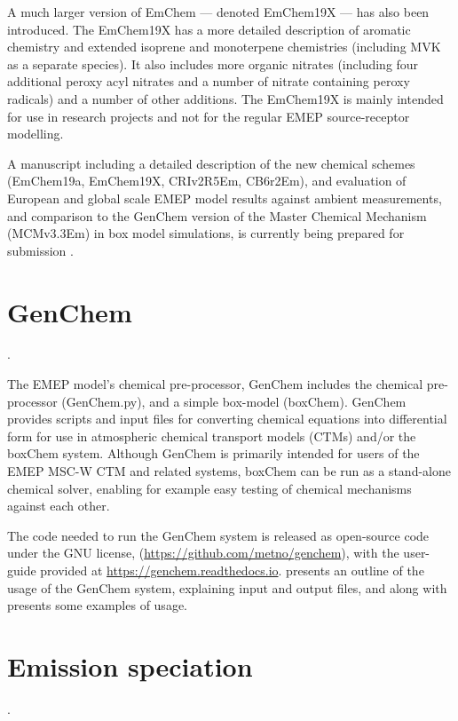 A much larger version of EmChem --- denoted EmChem19X --- has also
been introduced.  The EmChem19X has a more detailed description of
aromatic chemistry and extended isoprene and monoterpene chemistries
(including MVK as a separate species). It also includes more organic
nitrates (including four additional peroxy acyl nitrates and a number of
nitrate containing peroxy radicals) and a number of other additions. The
EmChem19X is mainly intended for use in research projects and not for
the regular EMEP source-receptor modelling.

A manuscript including a detailed description of the new chemical schemes
(EmChem19a, EmChem19X, CRIv2R5Em, CB6r2Em), and evaluation of European
and global scale EMEP model results against ambient measurements,
and comparison to the GenChem version of the Master Chemical Mechanism
(MCMv3.3Em) in box model simulations, is currently being prepared for
submission \citep{BergstromEmChem2020}.

\section{GenChem}
\label{sec:GChem}.

The EMEP model's chemical pre-processor, GenChem \citep{Simpson:GenChem}
includes the chemical pre-processor (GenChem.py), and a simple box-model
(boxChem). GenChem provides scripts and input files for converting
chemical equations into differential form for use in atmospheric chemical
transport models (CTMs) and/or the boxChem system.  Although GenChem is
primarily intended for users of the EMEP MSC-W CTM and related systems,
boxChem can be run as a stand-alone chemical solver, enabling for example
easy testing of chemical mechanisms against each other.


The code needed to run the GenChem  system is released as open-source
code under the GNU license, (\url{https://github.com/metno/genchem}),
with the user-guide provided at \url{https://genchem.readthedocs.io}.
\citet{Simpson:GenChem} presents an outline of the usage of the
GenChem system, explaining input and output files, and along with
\citet{BergstromEmChem2020} presents some examples of usage.



\section{Emission speciation}
\label{sec:emissplits}.



